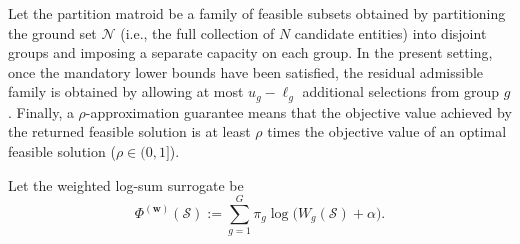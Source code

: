 \documentclass[10pt,journal]{IEEEtran}
\newcommand{\1}{\mathbf{1}}
\newcommand{\bw}{\mathbf{w}}
\newcommand{\Sel}{\mathcal{S}}
\theoremstyle{ieeethm}
\begin{document}
Let the partition matroid be a family of feasible subsets obtained by partitioning the ground set $\mathcal{N}$ (i.e., the full collection of $N$ candidate entities) into disjoint groups and imposing a separate capacity on each group. In the present setting, once the mandatory lower bounds have been satisfied, the residual admissible family is obtained by allowing at most $u_g-\ell_g$ additional selections from group $g$. Finally, a $\rho$-approximation guarantee means that the objective value achieved by the returned feasible solution is at least $\rho$ times the objective value of an optimal feasible solution ($\rho\in(0,1]$).

Let the weighted log-sum surrogate be
\begin{equation}
\label{eq:phi_w_definition}
\Phi^{(\bw)}(\Sel)
:=
\sum_{g=1}^{G}\pi_g\log\big(W_g(\Sel)+\alpha\big).
\end{equation}
\end{document}
